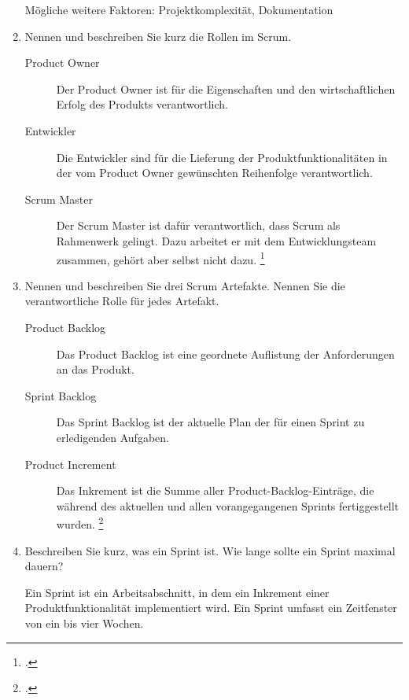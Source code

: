 \documentclass{lehramt-informatik-aufgabe}
\begin{document}
\begin{enumerate}
\begin{liAntwort}
Mögliche weitere Faktoren: Projektkomplexität, Dokumentation
\end{liAntwort}


\item Nennen und beschreiben Sie kurz die Rollen im Scrum.

\begin{liAntwort}
\begin{description}
\item[Product Owner]

Der Product Owner ist für die Eigenschaften und den wirtschaftlichen
Erfolg des Produkts verantwortlich.

\item[Entwickler]
Die Entwickler sind für die Lieferung der Produktfunktionalitäten in der
vom Product Owner gewünschten Reihenfolge verantwortlich.

\item[Scrum Master]

Der Scrum Master ist dafür verantwortlich, dass Scrum als Rahmenwerk
gelingt. Dazu arbeitet er mit dem Entwicklungsteam zusammen, gehört aber
selbst nicht dazu.
\footcite{wiki:scrum}
\end{description}
\end{liAntwort}


\item Nennen und beschreiben Sie drei Scrum Artefakte. Nennen Sie die
verantwortliche Rolle für jedes Artefakt.

\begin{liAntwort}
\begin{description}
\item[Product Backlog]

Das Product Backlog ist eine geordnete Auflistung der Anforderungen an
das Produkt.

\item[Sprint Backlog]

Das Sprint Backlog ist der aktuelle Plan der für einen Sprint zu
erledigenden Aufgaben.

\item[Product Increment]

Das Inkrement ist die Summe aller Product-Backlog-Einträge, die während
des aktuellen und allen vorangegangenen Sprints fertiggestellt wurden.
\footcite{wiki:scrum}
\end{description}
\end{liAntwort}


\item Beschreiben Sie kurz, was ein Sprint ist. Wie lange sollte ein
Sprint maximal dauern?

\begin{liAntwort}
Ein Sprint ist ein Arbeitsabschnitt, in dem ein Inkrement einer
Produktfunktionalität implementiert wird. Ein Sprint umfasst ein
Zeitfenster von ein bis vier Wochen.
\end{liAntwort}

\end{enumerate}
\end{document}
